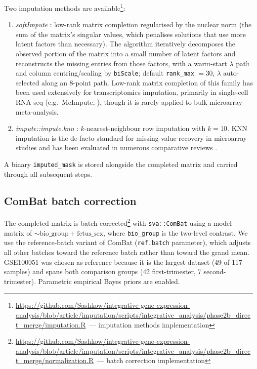 \documentclass[11pt,a4paper]{article}
\newcommand{\ghb}{https://github.com/Sashkow/integrative-gene-expression-analysis/blob/article/imputation}
\newcommand{\src}[2]{\footnote{\url{\ghb/#1}~--- #2}}
\begin{document}
Two imputation methods are
available\src{scripts/integrative_analysis/phase2b_direct_merge/imputation.R}{imputation methods implementation}:
\begin{enumerate}
  \item \textit{softImpute} \citep{Mazumder2010,Hastie2015}:
    low-rank matrix completion regularised by the nuclear norm
    (the sum of the matrix's singular values, which penalises
    solutions that use more latent factors than necessary). The
    algorithm iteratively decomposes the observed portion of the
    matrix into a small number of latent factors and reconstructs
    the missing entries from those factors, with a warm-start
    $\lambda$ path and column centring/scaling by
    \texttt{biScale}; default \texttt{rank\_max} $= 30$,
    $\lambda$ auto-selected along an 8-point path. Low-rank
    matrix completion of this family has been used extensively
    for transcriptomics imputation, primarily in single-cell
    RNA-seq (e.g.~McImpute, \citealp{Mongia2019}), though it is
    rarely applied to bulk microarray meta-analysis.
  \item \textit{impute::impute.knn} \citep{Troyanskaya2001}:
    $k$-nearest-neighbour row imputation with $k = 10$. KNN
    imputation is the de-facto standard for missing-value recovery
    in microarray studies and has been evaluated in numerous
    comparative reviews
    \citep{Aittokallio2010,Liew2011}.
\end{enumerate}
A binary \texttt{imputed\_mask} is stored alongside the completed
matrix and carried through all subsequent steps.

\subsection{ComBat batch correction}

The completed matrix is
batch-corrected\src{scripts/integrative_analysis/phase2b_direct_merge/normalization.R}{batch correction implementation}
with
\texttt{sva::ComBat} using a model matrix of
$\sim\!\text{bio\_group}+\text{fetus\_sex}$, where
\texttt{bio\_group} is the two-level contrast. We use the
reference-batch variant of ComBat (\texttt{ref.batch}
parameter), which adjusts all other batches toward the
reference batch rather than toward the grand mean. GSE100051
was chosen as reference because it is the largest dataset
(49 of 117 samples) and spans both comparison groups (42
first-trimester, 7 second-trimester). Parametric empirical
Bayes priors are enabled.
\end{document}
